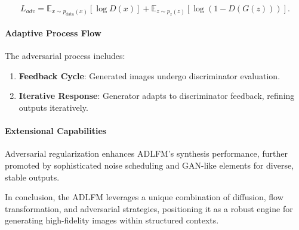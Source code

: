 \begin{equation}
L_{adv} = \mathbb{E}_{x \sim p_{\text{data}}(x)} [\log D(x)] + \mathbb{E}_{z \sim p_{z}(z)} [\log(1 - D(G(z)))].
\end{equation}

\paragraph{Adaptive Process Flow}

The adversarial process includes:
\begin{enumerate}
    \item \textbf{Feedback Cycle}: Generated images undergo discriminator evaluation.
    \item \textbf{Iterative Response}: Generator adapts to discriminator feedback, refining outputs iteratively.
\end{enumerate}

\paragraph{Extensional Capabilities}

Adversarial regularization enhances ADLFM's synthesis performance, further promoted by sophisticated noise scheduling and GAN-like elements \cite{goodfellow2014generative} for diverse, stable outputs.

In conclusion, the ADLFM leverages a unique combination of diffusion, flow transformation, and adversarial strategies, positioning it as a robust engine for generating high-fidelity images within structured contexts.

